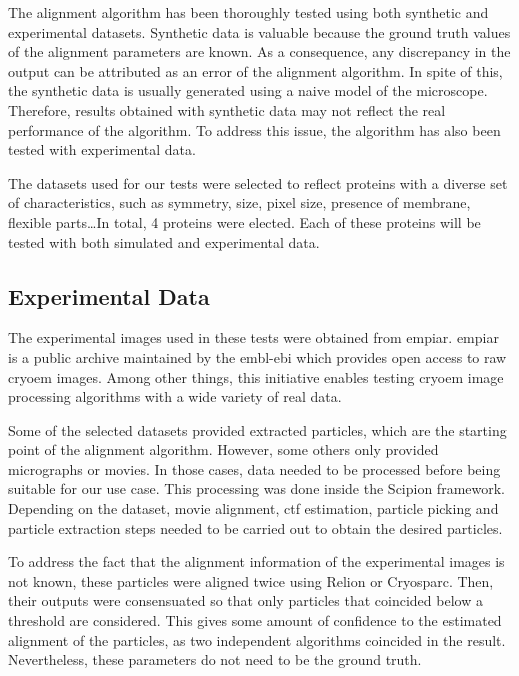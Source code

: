 \documentclass[../main.tex]{subfiles}
\begin{document}
The alignment algorithm has been thoroughly tested using both synthetic and experimental datasets. Synthetic data is valuable because the ground truth values of the alignment parameters are known. As a consequence, any discrepancy in the output can be attributed as an error of the alignment algorithm. In spite of this, the synthetic data is usually generated using a naive model of the microscope. Therefore, results obtained with synthetic data may not reflect the real performance of the algorithm. To address this issue, the algorithm has also been tested with experimental data.

The datasets used for our tests were selected to reflect proteins with a diverse set of characteristics, such as symmetry, size, pixel size, presence of membrane, flexible parts\dots In total, 4 proteins were elected. Each of these proteins will be tested with both simulated and experimental data.

\subsection{Experimental Data}
The experimental images used in these tests were obtained from \gls{empiar}. \Gls{empiar} is a public archive maintained by the \gls{embl}-\gls{ebi} which provides open access to raw \gls{cryoem} images\cite{iudin2022}. Among other things, this initiative enables testing \gls{cryoem} image processing algorithms with a wide variety of real data.

Some of the selected datasets provided extracted particles, which are the starting point of the alignment algorithm. However, some others only provided micrographs or movies. In those cases, data needed to be processed before being suitable for our use case. This processing was done inside the Scipion framework. Depending on the dataset, movie alignment, \gls{ctf} estimation, particle picking and particle extraction steps needed to be carried out to obtain the desired particles.

To address the fact that the alignment information of the experimental images is not known, these particles were aligned twice using Relion\cite{scheres2021} or Cryosparc\cite{cryosparc}. Then, their outputs were consensuated so that only particles that coincided below a threshold are considered. This gives some amount of confidence to the estimated alignment of the particles, as two independent algorithms coincided in the result. Nevertheless, these parameters do not need to be the ground truth.
\end{document}
